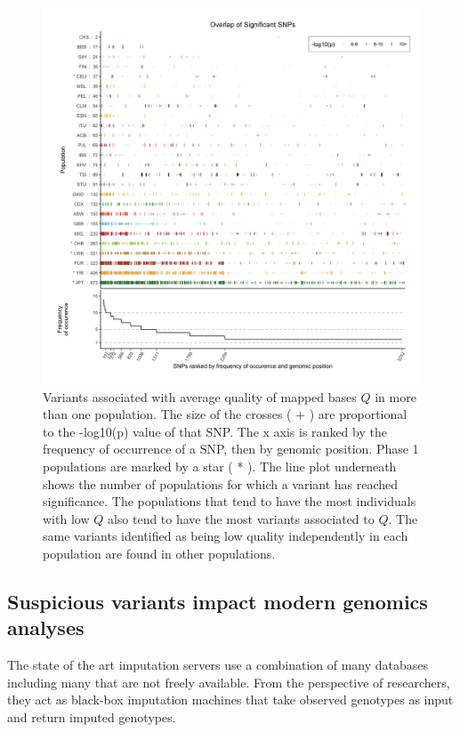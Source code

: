 \documentclass[9pt,lineno]{elife}
\begin{document}
\begin{figure}
\includegraphics[width=\hsize,keepaspectratio]{./Figures/SNPOverlap6.jpg}

\caption{Variants associated with average quality of mapped bases $Q$ in more than one population.
The size of the crosses ( + ) are proportional to the -log10(p) value of that SNP.
The x axis is ranked by the frequency of occurrence of a SNP, then by genomic position.
Phase 1 populations are marked by a star ( * ).
The line plot underneath shows the number of populations for which a variant has reached significance.
The populations that tend to have the most individuals with low $Q$ also tend to have the most variants associated to $Q$. 
The same variants identified as being low quality independently in each population are found in other populations. }
  \label{OverLap}
\end{figure}

\subsection{Suspicious variants impact modern genomics analyses}
The state of the art imputation servers use a combination of many databases including many that are not freely available.
From the perspective of researchers, they act as black-box imputation machines that take observed genotypes as input and return imputed genotypes.  
\end{document}
